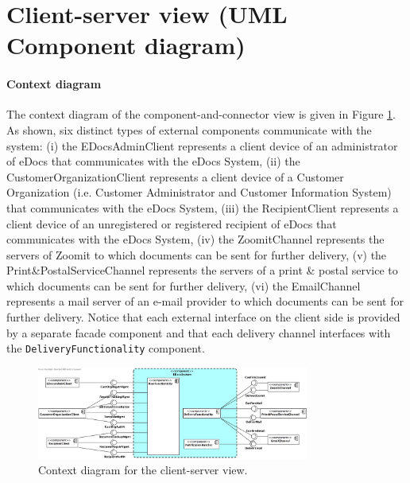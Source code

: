 \documentclass[a4paper,10pt]{article}
\begin{document}
\section{Client-server view (UML Component diagram)}\label{sec:client-server}
\paragraph{Context diagram}
The context diagram of the component-and-connector view is given in Figure \ref{fig:cc-context}. As shown, six distinct types of external components communicate with the system:
(i) the EDocsAdminClient represents a client device of an administrator of eDocs that communicates with the eDocs System,
(ii) the CustomerOrganizationClient represents a client device of a Customer Organization (i.e. Customer Administrator and Customer Information System) that communicates with the eDocs System,
(iii) the RecipientClient represents a client device of an unregistered or registered recipient of eDocs that communicates with the eDocs System,
(iv) the ZoomitChannel represents the servers of Zoomit to which documents can be sent for further delivery,
(v) the Print\&PostalServiceChannel represents the servers of a print \& postal service to which documents can be sent for further delivery,
(vi) the EmailChannel represents a mail server of an e-mail provider to which documents can be sent for further delivery.
Notice that each external interface on the client side is provided by a separate facade component and that each delivery channel interfaces with the \texttt{DeliveryFunctionality} component.

\begin{figure}[!htp]
	\centering
	\includegraphics[width=0.8\textwidth]{ContextDiagram.png}
	\caption{Context diagram for the client-server view.}
	\label{fig:cc-context}
\end{figure}
\FloatBarrier
\end{document}

